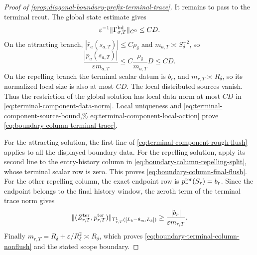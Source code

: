 \begin{proof}[Proof of
\cref{prop:diagonal-boundary-prefix-terminal-trace}]
It remains to pass to the terminal recut.  The global state estimate gives
\begin{equation}
 \varepsilon^{-1}\|\Gamma_{\sigma,T}^{\rm bd}\|_{C^0}
 \le CD.                                         \label{eq:proof-boundary-terminal-history}
\end{equation}
On the attracting branch,
\(|\bar r_a(s_{a,T})|\le C\rho_\delta\) and
\(m_{a,T}\asymp S_\delta^{-2}\), so
\begin{equation*}
 \frac{|p_a(s_{a,T})|}{\varepsilon m_{a,T}}
 \le C\frac{\rho_\delta}{m_{a,T}}D\le CD.
\end{equation*}
On the repelling branch the terminal scalar datum is \(b_r\), and
\(m_{r,T}\asymp R_\delta\), so its normalized local size is also at most
\(CD\).  The local distributed sources vanish.  Thus the restriction of
the global solution has local data norm at most \(CD\) in
\cref{eq:terminal-component-data-norm}.  Local uniqueness and
\cref{eq:terminal-component-source-bound,%
eq:terminal-component-local-action} prove
\cref{eq:boundary-column-terminal-trace}.

For the attracting solution, the first line of
\cref{eq:terminal-component-rough-flush} applies to all the displayed
boundary data.  For the repelling solution, apply its second line to the
entry-history column in \cref{eq:boundary-column-repelling-split}, whose
terminal scalar row is zero.  This proves
\cref{eq:boundary-column-final-flush}.  For the other repelling column,
the exact endpoint row is \(p_r^{\rm ter}(S_r)=b_r\).  Since the endpoint
belongs to the final history window, the zeroth term of the terminal trace
norm gives
\begin{equation*}
 \|(Z_{r,T}^{\rm ter},p_{r,T}^{\rm ter})\|_
       {\mathsf T_{r,T}^1([L_b-\theta_m,L_b])}
 \ge\frac{|b_r|}{\varepsilon m_{r,T}}.
\end{equation*}
Finally \(m_{r,T}=R_\delta+\varepsilon/R_\delta^2\asymp R_\delta\),
which proves \cref{eq:boundary-terminal-column-nonflush} and the stated
scope boundary.
\end{proof}

